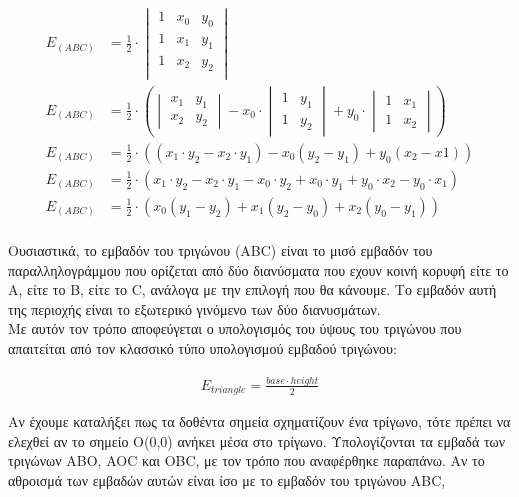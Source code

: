 \documentclass[12pt]{article}
\begin{document}
\begin{align*}
E_{(ABC)} &= \frac{1}{2} \cdot 
\begin{vmatrix} 
1 & x_0 & y_0 \\ 
1 & x_1 & y_1 \\
1 & x_2 & y_2 \\
\end{vmatrix} \\
E_{(ABC)} &= \frac{1}{2} \cdot (
\begin{vmatrix} 
x_1 & y_1 \\ 
x_2 & y_2 
\end{vmatrix} -
x_0 \cdot 
\begin{vmatrix} 
1 & y_1 \\ 
1 & y_2 
\end{vmatrix} +
y_0 \cdot 
\begin{vmatrix} 
1 & x_1 \\ 
1 & x_2 
\end{vmatrix}) \\
E_{(ABC)} &= \frac{1}{2} \cdot (
(x_1 \cdot y_2 - x_2 \cdot y_1) - x_0(y_2 - y_1) + y_0(x_2 - x1))\\
E_{(ABC)} &= \frac{1}{2} \cdot (
x_1 \cdot y_2 - x_2 \cdot y_1 - x_0 \cdot y_2 + x_0 \cdot y_1 + y_0 \cdot x_2 - y_0 \cdot x_1)\\
E_{(ABC)} &= \frac{1}{2} \cdot (
x_0(y_1 - y_2) + x_1 (y_2 - y_0) + x_2(y_0 - y_1))\\
\end{align*}

Ουσιαστικά, το εμβαδόν του τριγώνου (ABC) είναι το μισό εμβαδόν του παραλληλογράμμου που ορίζεται από δύο διανύσματα που εχουν κοινή κορυφή είτε το A, είτε το B, είτε το C, ανάλογα με την επιλογή που θα κάνουμε. Το εμβαδόν αυτή της περιοχής είναι το εξωτερικό γινόμενο των δύο διανυσμάτων.\\

Με αυτόν τον τρόπο αποφεύγεται ο υπολογισμός του ύψους του τριγώνου που απαιτείται από τον κλασσικό τύπο υπολογισμού εμβαδού τριγώνου:

\begin{align*}
E_{triangle} = \frac{base\cdot height}{2}
\end{align*}

Αν έχουμε καταλήξει πως τα δοθέντα σημεία σχηματίζουν ένα τρίγωνο, τότε πρέπει να ελεχθεί αν το σημείο Ο(0,0) ανήκει μέσα στο τρίγωνο. Υπολογίζονται τα εμβαδά των τριγώνων ABO, AOC και OBC, με τον τρόπο που αναφέρθηκε παραπάνω. Αν το αθροισμά των εμβαδών αυτών είναι ίσο με το εμβαδόν του τριγώνου ABC,
\end{document}
